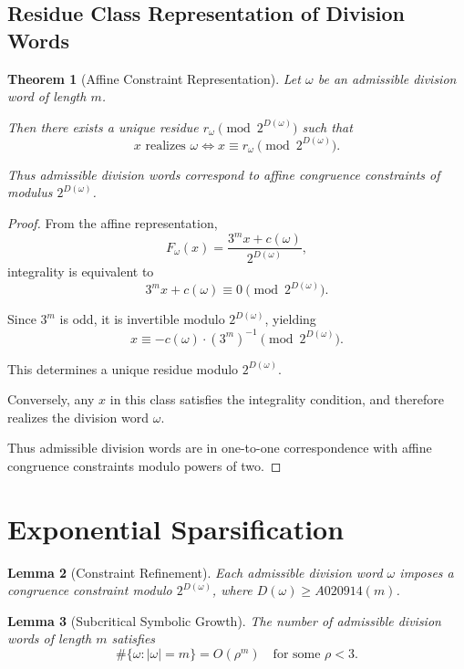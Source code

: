 \documentclass[12pt, oneside]{article}
\numberwithin{equation}{section}
\theoremstyle{definition}
\theoremstyle{plain}
\newtheorem{theorem}{Theorem}[section]
\newtheorem{lemma}[theorem]{Lemma}
\theoremstyle{remark}
\begin{document}
\subsection{Residue Class Representation of Division Words}

\begin{theorem}[Affine Constraint Representation]
Let $\omega$ be an admissible division word of length $m$.

Then there exists a unique residue $r_\omega \pmod{2^{D(\omega)}}$ such that
\[
x \text{ realizes } \omega \iff x \equiv r_\omega \pmod{2^{D(\omega)}}.
\]

Thus admissible division words correspond to affine congruence constraints
of modulus $2^{D(\omega)}$.
\end{theorem}

\begin{proof}
From the affine representation,
\[
F_\omega(x) = \frac{3^m x + c(\omega)}{2^{D(\omega)}},
\]
integrality is equivalent to
\[
3^m x + c(\omega) \equiv 0 \pmod{2^{D(\omega)}}.
\]

Since $3^m$ is odd, it is invertible modulo $2^{D(\omega)}$, yielding
\[
x \equiv -c(\omega) \cdot (3^m)^{-1} \pmod{2^{D(\omega)}}.
\]

This determines a unique residue modulo $2^{D(\omega)}$.

Conversely, any $x$ in this class satisfies the integrality condition,
and therefore realizes the division word $\omega$.

Thus admissible division words are in one-to-one correspondence with affine
congruence constraints modulo powers of two.
\end{proof}

\section{Exponential Sparsification}
\label{sec:exponential-sparsification}

\begin{lemma}[Constraint Refinement]
Each admissible division word $\omega$ imposes a congruence constraint
modulo $2^{D(\omega)}$, where $D(\omega) \ge A020914(m)$.
\end{lemma}

\begin{lemma}[Subcritical Symbolic Growth]
The number of admissible division words of length $m$ satisfies
\[
\#\{\omega : |\omega|=m\} = O(\rho^m)
\quad \text{for some } \rho < 3.
\]
\end{lemma}
\end{document}
